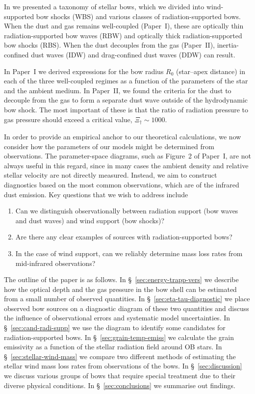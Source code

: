 \documentclass[useAMS, usenatbib, a4paper]{mnras}
\begin{document}
In \citet[Paper~I and Paper~II]{Henney:2019a, Henney:2019b} we
presented a taxonomy of stellar bows, which we divided into
wind-supported bow shocks (WBS) and various classes of
radiation-supported bows.  When the dust and gas remains well-coupled
(Paper~I), these are optically thin radiation-supported bow waves
(RBW) and optically thick radiation-supported bow shocks (RBS).  When
the dust decouples from the gas (Paper~II), inertia-confined dust
waves (IDW) and drag-confined dust waves (DDW) can result.

In Paper~I we derived expressions for the bow radius \(R_0\)
(star--apex distance) in each of the three well-coupled regimes as a
function of the parameters of the star and the ambient medium.  In
Paper~II, we found the criteria for the dust to decouple from the gas
to form a separate dust wave outside of the hydrodynamic bow shock.
The most important of these is that the ratio of radiation pressure to
gas pressure should exceed a critical value, \(\Xi_\dag \sim 1000\).

In order to provide an empirical anchor to our theoretical
calculations, we now consider how the parameters of our models might
be determined from observations.  The parameter-space diagrams, such
as Figure~2 of Paper~I, are not always useful in this regard, since in
many cases the ambient density and relative stellar velocity are not
directly measured.  Instead, we aim to construct diagnostics based on
the most common observations, which are of the infrared dust emission.
Key questions that we wish to address include
\begin{enumerate}[1.]
\item Can we distinguish observationally between radiation support
  (bow waves and dust waves) and wind support (bow shocks)?
\item Are there any clear examples of sources with radiation-supported bows?
\item In the case of wind support, can we reliably determine mass loss
  rates from mid-infrared observations?
\end{enumerate}

The outline of the paper is as follows. In
\S~\ref{sec:energy-trapp-vers} we describe how the optical depth and
the gas pressure in the bow shell can be estimated from a small number
of observed quantities.  In \S~\ref{sec:eta-tau-diagnostic} we place
observed bow sources on a diagnostic diagram of these two quantities
and discuss the influence of observational errors and systematic model
uncertainties. In \S~\ref{sec:cand-radi-supp} we use the diagram to
identify some candidates for radiation-supported bows. In
\S~\ref{sec:grain-temp-emiss} we calculate the grain emissivity as a
function of the stellar radiation field around OB stars.  In
\S~\ref{sec:stellar-wind-mass} we compare two different methods of
estimating the stellar wind mass loss rates from observations of the
bows. In \S~\ref{sec:discussion} we discuss various groups of bows
that require special treatment due to their diverse physical
conditions. In \S~\ref{sec:conclusions} we summarise out findings.
\end{document}
